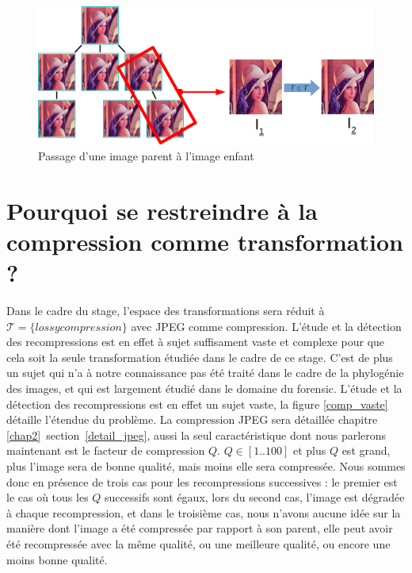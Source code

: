 \documentclass[utf8]{stageM2R} %
\begin{document}
\begin{figure}
  \begin{center}
    \includegraphics[width=120mm]{images/tree_extract}
    \caption{Passage d'une image parent à l'image enfant}
    \label{fig:tree-extract}
  \end{center}
\end{figure}

\section{Pourquoi se restreindre à la compression comme transformation ?}
Dans le cadre du stage, l'espace des transformations sera réduit à $\mathcal{T} = \{lossy compression\}$ avec JPEG comme compression. L'étude et la détection des recompressions est en effet à sujet suffisament vaste et complexe pour que cela soit la seule transformation étudiée dans le cadre de ce stage. C'est de plus un sujet qui n'a à notre connaissance pas été traité dans le cadre de la phylogénie des images, et qui est largement étudié dans le domaine du forensic. L'étude et la détection des recompressions est en effet un sujet vaste, la figure \ref{comp_vaste} détaille l'étendue du problème. La compression JPEG sera détaillée chapitre \ref{chap2}~section~\ref{detail_jpeg}, aussi la seul caractéristique dont nous parlerons maintenant est le facteur de compression $Q$. $Q \in [1..100]$ et plus $Q$ est grand, plus l'image sera de bonne qualité, mais moins elle sera compressée. Nous sommes donc en présence de trois cas pour les recompressions successives : le premier est le cas où tous les $Q$ successifs sont égaux, lors du second cas, l'image est dégradée à chaque recompression, et dans le troisième cas, nous n'avons aucune idée sur la manière dont l'image a été compressée par rapport à son parent, elle peut avoir été recompressée avec la même qualité, ou une meilleure qualité, ou encore une moins bonne qualité.
\end{document}
